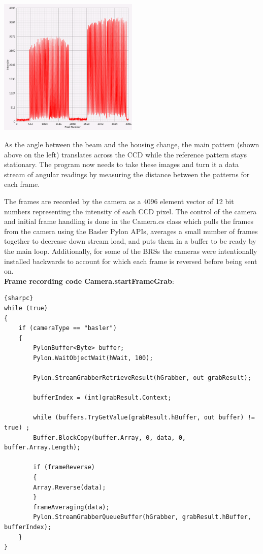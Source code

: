 \documentclass{article}
\begin{document}
\begin{center}
\includegraphics[width=0.5\textwidth]{BRSReadoutScreenPatterns.png}\\
\end{center}

As the angle between the beam and the housing change, the main pattern (shown above on the left) translates across the CCD while the reference pattern stays stationary. The program now needs to take these images and turn it a data stream of angular readings by measuring the distance between the patterns for each frame.

The frames are recorded by the camera as a 4096 element vector of 12 bit numbers representing the intensity of each CCD pixel. The control of the camera and initial frame handling is done in the Camera.cs class which pulls the frames from the camera using the Basler Pylon APIs, averages a small number of frames together to decrease down stream load, and puts them in a buffer to be ready by the main loop. Additionally, for some of the BRSs the cameras were intentionally installed backwards to account for which each frame is reversed before being sent on.\\

\textbf{Frame recording code Camera.startFrameGrab}:
\begin{lstlisting}{sharpc}
while (true)
{
	if (cameraType == "basler")
	{
	    PylonBuffer<Byte> buffer;
	    Pylon.WaitObjectWait(hWait, 100);

	    Pylon.StreamGrabberRetrieveResult(hGrabber, out grabResult);

	    bufferIndex = (int)grabResult.Context;

	    while (buffers.TryGetValue(grabResult.hBuffer, out buffer) != true) ;
	    Buffer.BlockCopy(buffer.Array, 0, data, 0, buffer.Array.Length);

	    if (frameReverse)
	    {
		Array.Reverse(data);
	    }
	    frameAveraging(data);
	    Pylon.StreamGrabberQueueBuffer(hGrabber, grabResult.hBuffer, bufferIndex);
	}
}
\end{lstlisting}
\end{document}
